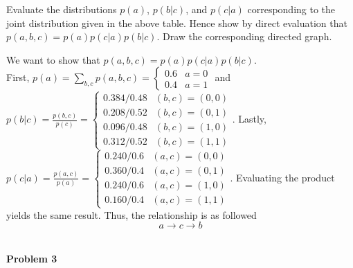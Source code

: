 \documentclass{article}
\begin{document}
Evaluate the distributions $p(a)$, $p(b|c)$, and $p(c|a)$ corresponding to the joint distribution given in the 
above table. Hence show by direct evaluation that $p(a, b, c) = p(a)p(c|a)p(b|c)$. Draw the 
corresponding directed graph.

\color{blue}
\begin{sol}
    We want to show that $p(a, b, c) = p(a)p(c|a)p(b|c)$.\\
First, $p(a) = \sum_{b,c}p(a,b,c) = \begin{cases}
    0.6 & a = 0 \\
    0.4 & a = 1
\end{cases}$ 
and $p(b|c) =\frac{p(b,c)}{p(c)}=\begin{cases}
    0.384/0.48 & (b,c) = (0,0)\\
    0.208/0.52 & (b,c) = (0,1)\\
    0.096/0.48 & (b,c) = (1,0)\\
    0.312/0.52 & (b,c) = (1,1)
\end{cases}$.
Lastly, $p(c|a) = \frac{p(a,c)}{p(a)}=\begin{cases}
    0.240/0.6 & (a,c) = (0,0)\\
    0.360/0.4 & (a,c) = (0,1)\\
    0.240/0.6 & (a,c) = (1,0)\\
    0.160/0.4 & (a,c) = (1,1)
\end{cases}$.
Evaluating the product yields the same result. Thus, the relationship is as followed
$$a \rightarrow c \rightarrow b$$
\end{sol}
\color{black}
\leavevmode\\
\noindent
\Large{\textbf{Problem 3}}\normalsize
\\
\end{document}
